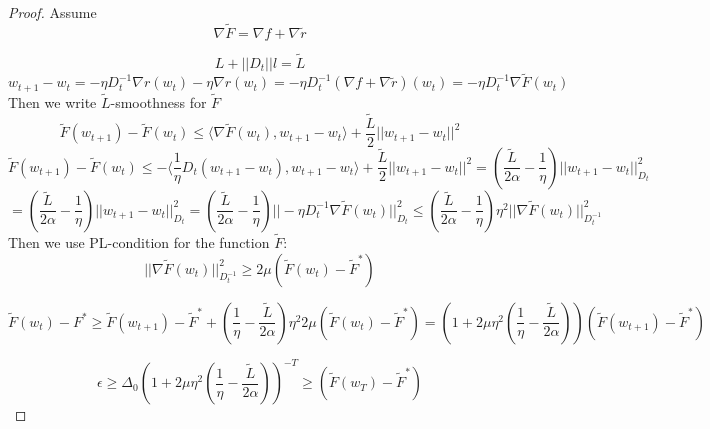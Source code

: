 \documentclass{article}
\begin{document}
\begin{proof}
    Assume 
    \begin{equation}
    \nabla \tilde{F} = \nabla f + \nabla \tilde{r}    
    \end{equation}
    
    \begin{equation}
    L + ||D_t||l = \tilde{L}        
    \end{equation}
    \begin{equation*}
    w_{t+1} - w_t = -\eta D_t^{-1} \nabla r(w_t) - \eta \nabla r(w_t) = -\eta D_t^{-1} (\nabla f + \nabla \tilde{r})(w_t) = -\eta D_t^{-1} \nabla \tilde{F}(w_t)    
    \end{equation*}
    Then we write $\tilde{L}$-smoothness for $\tilde{F}$ 
    \begin{equation*}
        \tilde{F}(w_{t+1}) - \tilde{F}(w_t) \leq  \langle \nabla \tilde{F}(w_t), w_{t+1} - w_t \rangle + \frac{\tilde{L}}{2} ||w_{t+1} - w_t||^2
    \end{equation*}
    \begin{equation*}
        \tilde{F}(w_{t+1}) - \tilde{F}(w_t) \leq - \langle \frac{1}{\eta} D_t(w_{t+1} - w_t), w_{t+1} - w_t \rangle + \frac{\tilde{L}}{2} ||w_{t+1} - w_t||^2 = (\frac{\tilde{L}}{2 \alpha} - \frac{1}{\eta}) ||w_{t+1} - w_t||^2_{D_t} 
    \end{equation*}
    \begin{equation*}
        = (\frac{\tilde{L}}{2 \alpha} - \frac{1}{\eta}) ||w_{t+1} - w_t||^2_{D_t} = (\frac{\tilde{L}}{2 \alpha} - \frac{1}{\eta}) ||-\eta D_t^{-1} \nabla \tilde{F}(w_t)||_{D_t}^2  \leq (\frac{\tilde{L}}{2 \alpha} - \frac{1}{\eta}) \eta^2 ||\nabla \tilde{F}(w_t)||^2_{D_t^{-1}}
    \end{equation*}
    Then we use PL-condition for the function $\tilde{F}$:
    \begin{equation*}
        ||\nabla \tilde{F}(w_t)||_{D_t^{-1}}^2 \geq 2 \mu (\tilde{F}(w_t) - \tilde{F}^*)
    \end{equation*}

    \begin{equation*}
    \tilde{F}(w_{t}) -  F^* \ge \tilde{F}(w_{t+1}) - \tilde{F}^* + (\frac{1}{\eta} - \frac{\tilde{L}}{2 \alpha}) \eta^2 2 \mu (\tilde{F}(w_t) - \tilde{F}^*) = \left( 1 +  2 \mu \eta^2(\frac{1}{\eta} - \frac{\tilde{L}}{2 \alpha}) \right) (\tilde{F}(w_{t+1}) - \tilde{F}^*)        
    \end{equation*}


    \begin{equation*}
    \epsilon \ge \Delta_0 \left( 1 +  2 \mu \eta^2(\frac{1}{\eta} - \frac{\tilde{L}}{2 \alpha}) \right)^{-T} \ge (\tilde{F}(w_{T}) - \tilde{F}^*)        
    \end{equation*}


\end{proof}
\end{document}
